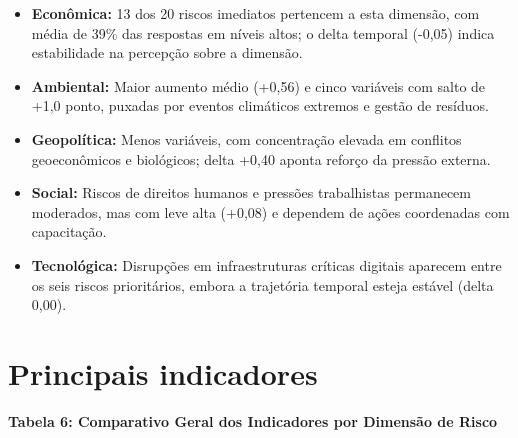 \documentclass[
  portuguese,
  letterpaper,
  DIV=11,
  numbers=noendperiod]{scrreprt}
\begin{document}
\begin{itemize}
\item
  \textbf{Econômica:} 13 dos 20 riscos imediatos pertencem a esta
  dimensão, com média de 39\% das respostas em níveis altos; o delta
  temporal (-0,05) indica estabilidade na percepção sobre a dimensão.
\item
  \textbf{Ambiental:} Maior aumento médio (+0,56) e cinco variáveis com
  salto de +1,0 ponto, puxadas por eventos climáticos extremos e gestão
  de resíduos.
\item
  \textbf{Geopolítica:} Menos variáveis, com concentração elevada em
  conflitos geoeconômicos e biológicos; delta +0,40 aponta reforço da
  pressão externa.
\item
  \textbf{Social:} Riscos de direitos humanos e pressões trabalhistas
  permanecem moderados, mas com leve alta (+0,08) e dependem de ações
  coordenadas com capacitação.
\item
  \textbf{Tecnológica:} Disrupções em infraestruturas críticas digitais
  aparecem entre os seis riscos prioritários, embora a trajetória
  temporal esteja estável (delta 0,00).
\end{itemize}

\section{Principais indicadores}\label{principais-indicadores}

\textbf{Tabela 6: Comparativo Geral dos Indicadores por Dimensão de
Risco}
\end{document}
